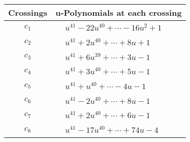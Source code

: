 \documentclass[1p]{elsarticle_modified}
\theoremstyle{definition}
\begin{document}
\begin{tabular}{m{50pt}|m{274pt}}
Crossings & \hspace{64pt}u-Polynomials at each crossing \\
\hline $$\begin{aligned}c_{1}\end{aligned}$$&$\begin{aligned}
&u^{41}-22 u^{40}+\cdots-16 u^2+1
\end{aligned}$\\
\hline $$\begin{aligned}c_{2}\end{aligned}$$&$\begin{aligned}
&u^{41}+2 u^{40}+\cdots+8 u+1
\end{aligned}$\\
\hline $$\begin{aligned}c_{3}\end{aligned}$$&$\begin{aligned}
&u^{41}+6 u^{39}+\cdots+3 u-1
\end{aligned}$\\
\hline $$\begin{aligned}c_{4}\end{aligned}$$&$\begin{aligned}
&u^{41}+3 u^{40}+\cdots+5 u-1
\end{aligned}$\\
\hline $$\begin{aligned}c_{5}\end{aligned}$$&$\begin{aligned}
&u^{41}+u^{40}+\cdots-4 u-1
\end{aligned}$\\
\hline $$\begin{aligned}c_{6}\end{aligned}$$&$\begin{aligned}
&u^{41}-2 u^{40}+\cdots+8 u-1
\end{aligned}$\\
\hline $$\begin{aligned}c_{7}\end{aligned}$$&$\begin{aligned}
&u^{41}+2 u^{40}+\cdots+6 u-1
\end{aligned}$\\
\hline $$\begin{aligned}c_{8}\end{aligned}$$&$\begin{aligned}
&u^{41}-17 u^{40}+\cdots+74 u-4
\end{aligned}$\\

\end{tabular}
\end{document}
